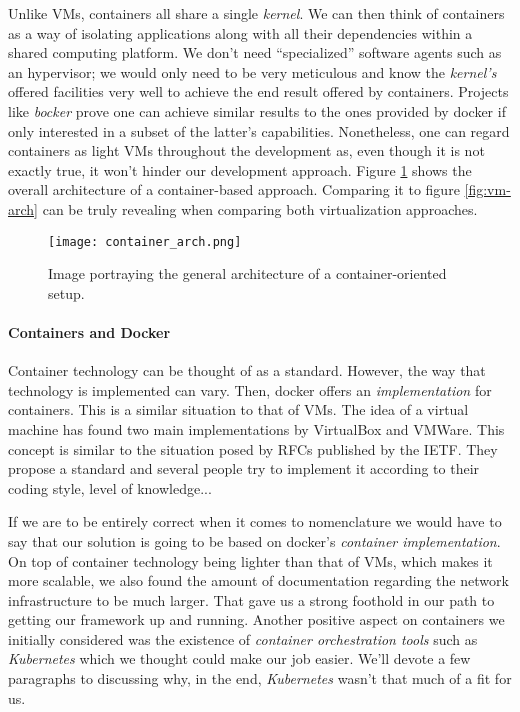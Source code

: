                 Unlike VMs, containers all share a single \textit{kernel}. We can then think of containers as a way of isolating applications along with all their dependencies within a shared computing platform. We don't need ``specialized'' software agents such as an hypervisor; we would only need to be very meticulous and know the \textit{kernel's} offered facilities very well to achieve the end result offered by containers. Projects like \textit{bocker} \cite{bib:bocker} prove one can achieve similar results to the ones provided by docker if only interested in a subset of the latter's capabilities. Nonetheless, one can regard containers as light VMs throughout the development as, even though it is not exactly true, it won't hinder our development approach. Figure \ref{fig:container-arch} shows the overall architecture of a container-based approach. Comparing it to figure \ref{fig:vm-arch} can be truly revealing when comparing both virtualization approaches.\\

                \begin{figure}
                    \centering
                    \texttt{[image: container\_arch.png]}
                    \caption[Container Setup]{Image portraying the general architecture of a container-oriented setup. \cite{bib:container-setup-img}}
                    \label{fig:container-arch}
                \end{figure}

                \paragraph{Containers and Docker}
                    Container technology can be thought of as a standard. However, the way that technology is implemented can vary. Then, docker offers an \textit{implementation} for containers. This is a similar situation to that of VMs. The idea of a virtual machine has found two main implementations by VirtualBox and VMWare. This concept is similar to the situation posed by RFCs published by the IETF. They propose a standard and several people try to implement it according to their coding style, level of knowledge...

                    If we are to be entirely correct when it comes to nomenclature we would have to say that our solution is going to be based on docker's \textit{container implementation}.\\

                On top of container technology being lighter than that of VMs, which makes it more scalable, we also found the amount of documentation regarding the network infrastructure to be much larger. That gave us a strong foothold in our path to getting our framework up and running. Another positive aspect on containers we initially considered was the existence of \textit{container orchestration tools} such as \textit{Kubernetes} which we thought could make our job easier. We'll devote a few paragraphs to discussing why, in the end, \textit{Kubernetes} wasn't that much of a fit for us.

